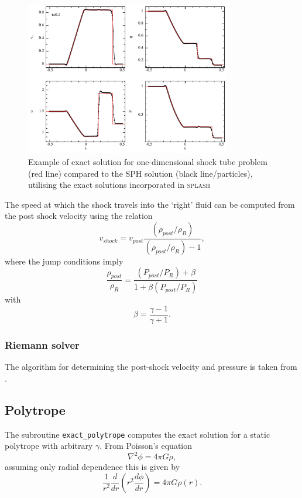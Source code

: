 \documentclass[a4paper,10pt]{article}
\newcommand{\splash}{\textsc{splash }}
\begin{document}
\begin{figure}
\begin{center}
\includegraphics[width=0.8\textwidth]{figs/sodshock.pdf}
\caption{Example of exact solution for one-dimensional shock tube problem (red line) compared to the SPH solution (black line/particles), utilising the exact solutions incorporated in \splash}
\label{fig:shocktube}
\end{center}
\end{figure}

 The speed at which the shock travels into the `right' fluid can be computed from the post shock
velocity using the relation
\begin{equation}
v_{shock} = v_{post}\frac{(\rho_{post}/\rho_R)}{(\rho_{post}/\rho_R)- 1},
\end{equation}
where the jump conditions imply
\begin{equation}
\frac{\rho_{post}}{\rho_R} = \frac{(P_{post}/P_R) + \beta}{1 + \beta (P_{post}/P_R)}
\end{equation}
with
\begin{equation}
\beta = \frac{\gamma - 1}{\gamma + 1}.
\end{equation}

\subsubsection{ Riemann solver}
 The algorithm for determining the post-shock velocity and pressure is taken
from \citet{toro92}.

\subsection{Polytrope}
 The subroutine \verb+exact_polytrope+ computes the exact solution for a static polytrope with
arbitrary $\gamma$. From Poisson's equation
\begin{equation}
\nabla^2 \phi = 4\pi G \rho,
\end{equation}
assuming only radial dependence this is given by
\begin{equation}
\frac{1}{r^{2}} \frac{d}{dr} \left(r^{2} \frac{d\phi}{dr} \right) = 4\pi G \rho(r).
\label{eq:poissonsph}
\end{equation}
  
\end{document}
